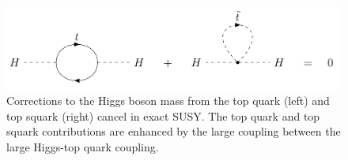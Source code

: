 \begin{figure}
\centering
\includegraphics[width=\textwidth]{figures/intro/higgs_top_stop_corrections.png}
\caption{Corrections to the Higgs boson mass from the top quark (left) and top squark (right) cancel in exact SUSY. The top quark and top squark contributions are enhanced by the large coupling between the large Higgs-top quark coupling.}
\label{higgs_top_stop_corrections}
\end{figure}